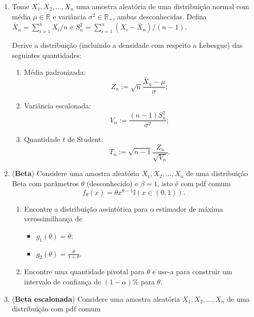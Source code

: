 \documentclass[a4paper,10pt, notitlepage]{report}
\newcommand{\rs}{X_1, X_2, \ldots, X_n} %
\begin{document}
\begin{enumerate} 
\item Tome $\rs$ uma amostra aleatória de uma distribuição normal com média $\mu \in \mathbb{R}$ e variância $\sigma^2 \in \mathbb{R}_+$, ambas desconhecidas.
Defina $\bar{X}_n = \sum_{i=1}^n X_i/n$ e $S_n^2 = \sum_{i=1}^n (X_i -\bar{X}_n )/(n-1)$.

Derive a distribuição (incluindo a densidade com respeito a Lebesgue) das seguintes quantidades:
\begin{enumerate}
    \item Média padronizada:
    \begin{equation*}
        Z_n  := \sqrt{n}\frac{\bar{X}_n - \mu}{\sigma};
    \end{equation*}
    \item Variância escalonada:
    \begin{equation*}
        V_n := \frac{(n-1)S_n^2}{\sigma^2};
    \end{equation*}
    \item Quantidade $t$ de Student:
    \begin{equation*}
        T_n := \sqrt{n-1}\frac{Z_n}{\sqrt{V_n}}.
    \end{equation*}
\end{enumerate}
 \item (\textbf{Beta}) 
 Considere uma amostra aleatória $\rs$  de uma distribuição Beta com parâmetros $\theta$ (desconhecido) e $\beta = 1$, isto é com pdf comum
 \begin{equation*}
     f_\theta(x) = \theta x^{\theta-1}\mathbb{I}(x \in (0, 1)).
 \end{equation*}
 \begin{enumerate}
     \item Encontre a distribuição assintótica para o estimador de máxima verossimilhança de
      \begin{itemize}
          \item $g_1(\theta) = \theta$;
          \item $g_2(\theta) = \frac{\theta}{1+\theta}$.
      \end{itemize}
     \item Encontre uma quantidade pivotal  para $\theta$ e use-a para construir um intervalo de confiança de $(1-\alpha)\%$ para $\theta$.
 \end{enumerate}
  \item (\textbf{Beta escalonada})
  Considere uma amostra aleatória $\rs$  de uma distribuição com pdf comum
   \begin{equation*}

\end{equation*}
\end{enumerate}
\end{document}
